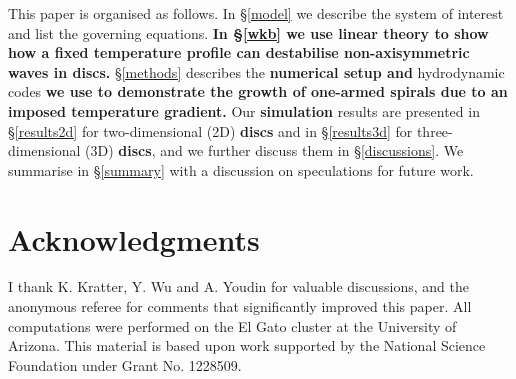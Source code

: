 \documentclass[useAMS,usenatbib]{mn2e}
\begin{document}
This paper is organised as follows. In \S\ref {model} we describe the system of interest
and list the governing equations. {\bf In \S\ref{wkb} we use linear theory  to show
  how a fixed temperature profile 
  can destabilise non-axisymmetric waves in discs.} \S\ref{methods} describes
the {\bf numerical setup and} hydrodynamic codes {\bf we use to 
  demonstrate the growth of one-armed spirals due to an imposed
  temperature gradient.} Our {\bf
  simulation} results are presented in  \S\ref{results2d} for two-dimensional (2D) {\bf
  discs} and in \S\ref{results3d} for three-dimensional (3D) {\bf discs}, and we further
discuss them in \S\ref{discussions}. We summarise in \S\ref{summary} 
with a discussion on speculations for future work. 







{\bf
\section*{Acknowledgments}
I thank K. Kratter, Y. Wu and A. Youdin for valuable discussions, and the
anonymous referee for comments that significantly improved this paper. All
computations were performed on the El Gato cluster at the University
of Arizona. This material is based upon work supported by the National
Science Foundation under Grant No. 1228509. 
}



\appendix

\end{document}
